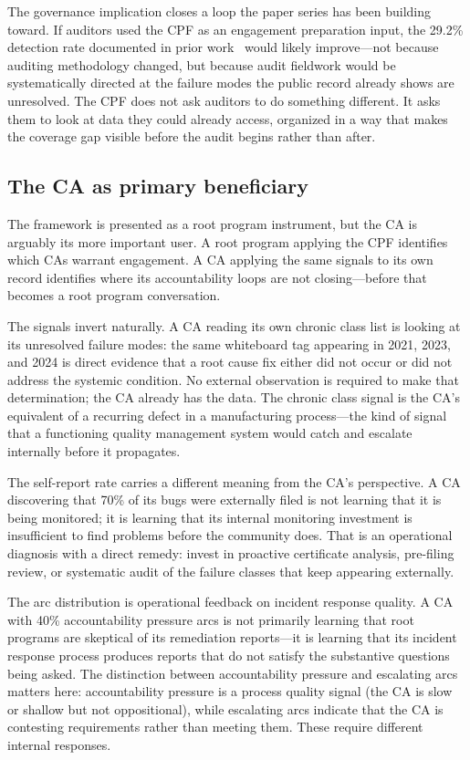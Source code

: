 \documentclass[10pt,twocolumn,letterpaper]{article}
\begin{document}
The governance implication closes a loop the paper series has been building toward.
If auditors used the CPF as an engagement preparation input, the 29.2\% detection rate
documented in prior work~\cite{p1} would likely improve---not because auditing
methodology changed, but because audit fieldwork would be systematically directed at
the failure modes the public record already shows are unresolved. The CPF does not ask
auditors to do something different. It asks them to look at data they could already
access, organized in a way that makes the coverage gap visible before the audit begins
rather than after.

\subsection{The CA as primary beneficiary}

The framework is presented as a root program instrument, but the CA is arguably its
more important user. A root program applying the CPF identifies which CAs warrant
engagement. A CA applying the same signals to its own record identifies where its
accountability loops are not closing---before that becomes a root program conversation.

The signals invert naturally. A CA reading its own chronic class list is looking at
its unresolved failure modes: the same whiteboard tag appearing in 2021, 2023, and
2024 is direct evidence that a root cause fix either did not occur or did not address
the systemic condition. No external observation is required to make that determination;
the CA already has the data. The chronic class signal is the CA's equivalent of a
recurring defect in a manufacturing process---the kind of signal that a functioning
quality management system would catch and escalate internally before it propagates.

The self-report rate carries a different meaning from the CA's perspective. A CA
discovering that 70\% of its bugs were externally filed is not learning that it is
being monitored; it is learning that its internal monitoring investment is insufficient
to find problems before the community does. That is an operational diagnosis with a
direct remedy: invest in proactive certificate analysis, pre-filing review, or
systematic audit of the failure classes that keep appearing externally.

The arc distribution is operational feedback on incident response quality. A CA
with 40\% accountability pressure arcs is not primarily learning that root programs
are skeptical of its remediation reports---it is learning that its incident response
process produces reports that do not satisfy the substantive questions being asked.
The distinction between accountability pressure and escalating arcs matters here:
accountability pressure is a process quality signal (the CA is slow or shallow but not
oppositional), while escalating arcs indicate that the CA is contesting requirements
rather than meeting them. These require different internal responses.
\end{document}
